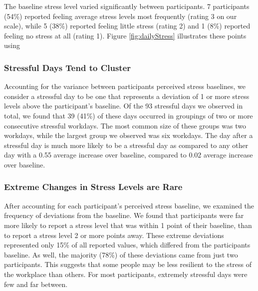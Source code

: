 The baseline stress level varied significantly between participants. 7
participants (54\%) reported feeling average stress levels most frequently
(rating 3 on our scale), while 5 (38\%) reported feeling little stress
(rating 2) and 1 (8\%) reported feeling no stress at all (rating 1). Figure \ref{fig:dailyStress} illustrates these points using 



\subsubsection{Stressful Days Tend to Cluster}
Accounting for the variance between participants perceived stress
baselines, we consider a stressful day to be one that represents a
deviation of 1 or more stress levels above the participant's
baseline. Of the 93 stressful days we observed in total, we found that
39 (41\%) of these days occurred in groupings of two or more
consecutive stressful workdays. The most common size of these groups
was two workdays, while the largest group we observed was six
workdays.  The day after a stressful day is much more likely to be a
stressful day as compared to any other day with a 0.55 average increase
over baseline, compared to 0.02 average increase over baseline.

\subsubsection{Extreme Changes in Stress Levels are Rare}
After accounting for each participant's perceived stress baseline, we
examined the frequency of deviations from the baseline. We found that
participants were far more likely to report a stress level that was
within 1 point of their baseline, than to report a stress level 2 or
more points away. These extreme deviations represented only 15\% of
all reported values, which differed from the participants baseline. As
well, the majority (78\%) of these deviations came from just two
participants. This suggests that some people may be less resilient to
the stress of the workplace than others. For most participants,
extremely stressful days were few and far between.

